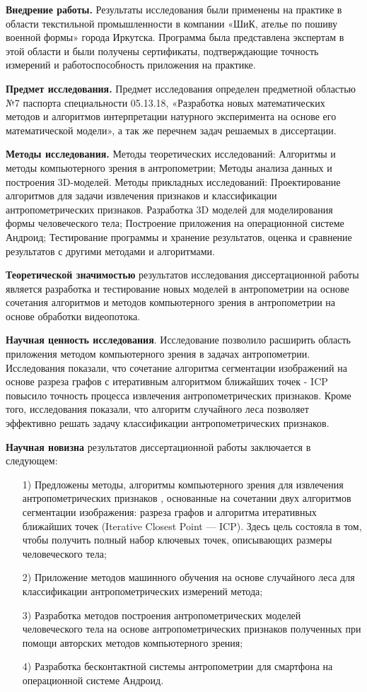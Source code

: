 \textbf{Внедрение работы.} Результаты исследования были применены на практике в области текстильной промышленности в компании «ШиК, ателье по пошиву военной формы» города Иркутска. Программа была представлена экспертам в этой области и были получены сертификаты, подтверждающие точность измерений и работоспособность приложения на практике.

\textbf{Предмет исследования.} Предмет исследования определен предметной областью №7 паспорта специальности 05.13.18, «Разработка новых математических методов и алгоритмов интерпретации натурного эксперимента на основе его математической модели», а так же перечнем задач решаемых в диссертации.

\textbf{Методы исследования.} Методы  теоретических исследований: Алгоритмы и методы компьютерного зрения в антропометрии; Методы анализа данных и построения 3D-моделей. Методы прикладных исследований: Проектирование алгоритмов для задачи извлечения признаков и классификации антропометрических признаков. Разработка 3D моделей для моделирования формы человеческого тела; Построение приложения на операционной системе Андроид; Тестирование программы и хранение результатов, оценка и сравнение результатов с другими методами и алгоритмами.

\textbf{Теоретической значимостью} результатов исследования диссертационной работы является разработка и тестирование новых моделей в антропометрии на основе сочетания алгоритмов и методов компьютерного зрения в антропометрии на основе обработки видеопотока.

\textbf{Научная ценность исследования}. Исследование позволило расширить область приложения методом компьютерного зрения в задачах антропометрии. Исследования показали, что сочетание алгоритма сегментации изображений на основе разреза графов с  итеративным алгоритмом ближайших точек -  ICP повысило точность процесса извлечения антропометрических признаков. Кроме того, исследования показали, что алгоритм случайного леса позволяет эффективно решать задачу классификации антропометрических признаков.

\textbf{Научная новизна} результатов диссертационной работы заключается в следующем:

\begin{enumerate}
	\item[1)] Предложены методы, алгоритмы компьютерного зрения для извлечения антропометрических признаков , основанные на сочетании двух алгоритмов сегментации изображения: разреза графов и алгоритма итеративных ближайших точек (Iterative Closest Point — ICP). Здесь цель состояла в том, чтобы получить полный набор ключевых точек, описывающих размеры человеческого тела;
	\item[2)] Приложение методов машинного обучения на основе случайного леса для классификации антропометрических измерений метода;
	\item[3)] Разработка методов построения антропометрических моделей человеческого тела на основе антропометрических признаков полученных при помощи авторских методов компьютерного зрения;
	\item[4)] Разработка бесконтактной системы антропометрии для смартфона на операционной системе Андроид.
\end{enumerate}

